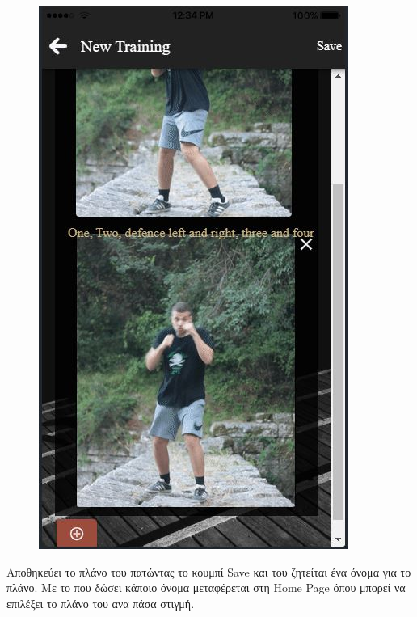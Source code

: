 \documentclass[a4paper,12pt]{article}
\begin{document}
\begin{figure}[!htb]
				\endminipage\hfill
				  \includegraphics[width=\linewidth]{plan4}
				  
				\endminipage
			\end{figure}

			\vspace*{1cm}

			Αποθηκεύει το πλάνο του πατώντας το κουμπί Save και του ζητείται ένα όνομα για το πλάνο. Με το που δώσει 
			κάποιο όνομα μεταφέρεται στη Home Page όπου μπορεί να επιλέξει το πλάνο του ανα πάσα στιγμή.
			\newpage
\end{document}

